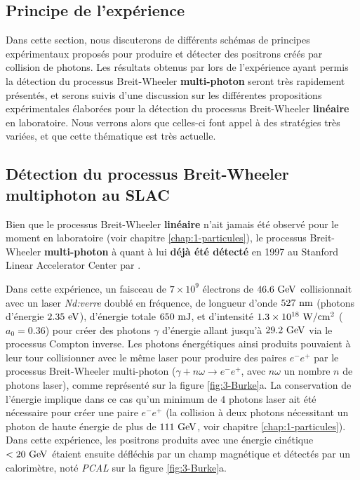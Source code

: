 \begin{refsection}
\section{Principe de l'expérience}

Dans cette section, nous discuterons de différents schémas de principes expérimentaux proposés pour produire et détecter des positrons créés par collision de photons.
Les résultats obtenus par \cite{burke_1997} lors de l'expérience ayant permis la détection du processus Breit-Wheeler \textbf{multi-photon} seront très rapidement présentés, et serons suivis d'une discussion sur les différentes propositions expérimentales élaborées pour la détection du processus Breit-Wheeler \textbf{linéaire} en laboratoire. Nous verrons alors que celles-ci font appel à des stratégies très variées, et que cette thématique est très actuelle. 

\subsection{Détection du processus Breit-Wheeler multiphoton au SLAC}

Bien que le processus Breit-Wheeler \textbf{linéaire} n'ait jamais été observé pour le moment en laboratoire (voir chapitre \ref{chap:1-particules}), le processus Breit-Wheeler \textbf{multi-photon} à quant à lui \textbf{déjà été détecté} en 1997 au Stanford Linear Accelerator Center par \cite{burke_1997}.

Dans cette expérience, un faisceau de $7 \times 10^9$ électrons de $46.6 ~ \rm GeV$ collisionnait avec un laser \textit{Nd:verre} doublé en fréquence, de longueur d'onde $527 ~ \rm nm$ (photons d'énergie $2.35 ~ \rm eV$), d'énergie totale $650 ~ \rm mJ$, et d'intensité $1.3 \times 10^{18} ~ \rm W/cm^2$ ($a_0 = 0.36$) pour créer des photons $\gamma$ d'énergie allant jusqu'à $29.2 ~ \rm GeV$ via le processus Compton inverse. Les photons énergétiques ainsi produits pouvaient à leur tour collisionner avec le même laser pour produire des paires $e^-e^+$ par le processus Breit-Wheeler multi-photon ($\gamma + n \omega \to e^- e^+$, avec $n \omega$ un nombre $n$ de photons laser), comme représenté sur la figure \ref{fig:3-Burke}a. La conservation de l'énergie implique dans ce cas qu'un minimum de $4$ photons laser ait été nécessaire pour créer une paire $e^-e^+$ (la collision à deux photons nécessitant un photon de haute énergie de plus de $111 ~ \rm GeV$, voir chapitre \ref{chap:1-particules}). Dans cette expérience, les positrons produits avec une énergie cinétique $<20 ~ \rm GeV$ étaient ensuite défléchis par un champ magnétique et détectés par un calorimètre, noté \textit{PCAL} sur la figure \ref{fig:3-Burke}a.


\end{refsection}
